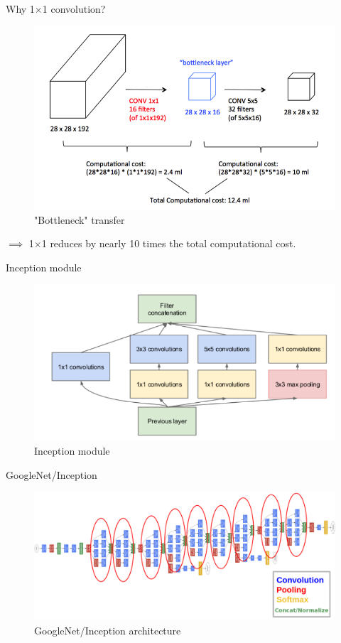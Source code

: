 \documentclass[aspectratio=169]{beamer}
\begin{document}
\begin{frame}{Why 1$\times$1 convolution?}
\begin{figure}
    \centering
    \includegraphics[scale=0.3]{demo/figs/cost2.png}
    \caption{"Bottleneck" transfer}
    \label{fig:cost2}
\end{figure}
$\implies$ 1$\times$1 reduces by nearly 10 times the total computational cost.

\end{frame}

\begin{frame}{Inception module}
\begin{figure}
    \centering
    \includegraphics[scale=0.45]{demo/figs/inceptionmodule.png}
    \caption{Inception module}
    \label{fig:inceptionmodule}
\end{figure}
\end{frame}

\begin{frame}{GoogleNet/Inception}
\begin{figure}
\includegraphics[scale=0.21]{demo/figs/inception.png}
\caption{GoogleNet/Inception architecture}
\label{fig:inception}
\end{figure}
\end{frame}
\end{document}
